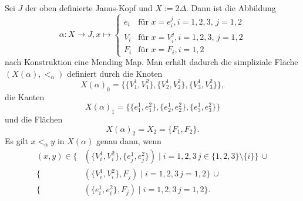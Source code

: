 \documentclass[12pt,titlepage]{article}
\begin{document}
  \begin{bsp}
  Sei $J$ der oben definierte Janus-Kopf und $X:= 2\Delta$. Dann ist die Abbildung 
  \[
  \alpha: X \to J, x \mapsto 
  \begin{cases}
e_i & \text{für } x =e_i^j ,i=1,2,3,\,j=1,2\\
V_i &\text{für } x =V_i^j,i=1,2,3,\,j=1,2\\
F_i &\text{für } x=F_i , i=1,2 
\end{cases}
  \]
  nach Konstruktion eine Mending Map. Man erhält dadurch die simpliziale Fläche $(X(\alpha),<_\alpha)$ definiert durch die Knoten
  \[
  X(\alpha)_0=\{\{V_1^1,V_1^2\},\{V_2^1,V_2^2\},\{V_3^1,V_3^2\}\},
  \]
  die Kanten
  \[
  X(\alpha)_1=\{\{e_1^1,e_1^2\},\{e_2^1,e_2^2\},\{e_3^1,e_3^2\}\}
  \]
  und die Flächen 
  \[
X(\alpha)_2=X_2=\{F_1,F_2\} .
  \]
  Es gilt $x<_{\alpha}y$ in $X(\alpha)$ genau dann, wenn
  \begin{align*}
 (x,y) \in \{&(\{V_i^1,V_i^2\}, \{e_j^1,e_j^2\})\mid i=1,2,3 \, j\in\{1,2,3\} \setminus \{i\}\}\, \cup\\
  \{&(\{V_i^1,V_i^2\}, F_j)\mid i=1,2,3 \, j=1,2 \} \,\cup\\
  \{&(\{e_i^1,e_i^2\}, F_j)\mid i=1,2,3 \, j=1,2 \}. 
\end{align*}
 \end{bsp}
\end{document}
